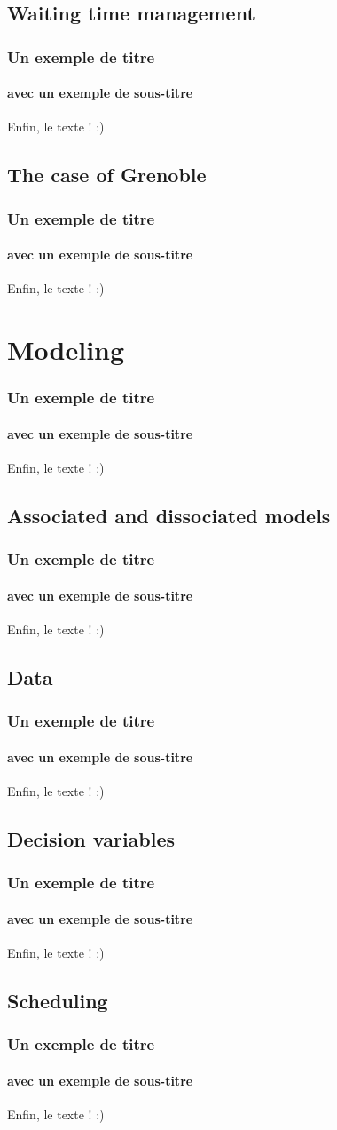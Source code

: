 \documentclass{beamer}
\begin{document}
	\subsection{Waiting time management}
	\begin{frame}
		\frametitle{Un exemple de titre}
		\framesubtitle{avec un exemple de sous-titre}
		Enfin, le texte ! :)
	\end{frame}
	\subsection{The case of Grenoble}
	\begin{frame}
		\frametitle{Un exemple de titre}
		\framesubtitle{avec un exemple de sous-titre}
		Enfin, le texte ! :)
	\end{frame}
	\section{Modeling}
	\begin{frame}
		\frametitle{Un exemple de titre}
		\framesubtitle{avec un exemple de sous-titre}
		Enfin, le texte ! :)
	\end{frame}
	\subsection{Associated and dissociated models}
	\begin{frame}
		\frametitle{Un exemple de titre}
		\framesubtitle{avec un exemple de sous-titre}
		Enfin, le texte ! :)
	\end{frame}
	\subsection{Data}
	\begin{frame}
		\frametitle{Un exemple de titre}
		\framesubtitle{avec un exemple de sous-titre}
		Enfin, le texte ! :)
	\end{frame}
	\subsection{Decision variables}
	\begin{frame}
		\frametitle{Un exemple de titre}
		\framesubtitle{avec un exemple de sous-titre}
		Enfin, le texte ! :)
	\end{frame}
	\subsection{Scheduling}
	\begin{frame}
		\frametitle{Un exemple de titre}
		\framesubtitle{avec un exemple de sous-titre}
		Enfin, le texte ! :)
	\end{frame}
\end{document}
